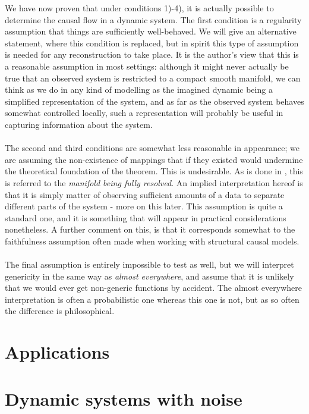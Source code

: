 \documentclass[11pt, a4paper]{memoir}
\theoremstyle{plain}
\theoremstyle{definition}
\begin{document}
We have now proven that under conditions 1)-4), it is actually possible to determine the causal flow in a dynamic system. The first condition is a regularity assumption that things are sufficiently well-behaved. We will give an alternative statement, where this condition is replaced, but in spirit this type of assumption is needed for any reconstruction to take place. It is the author's view that this is a reasonable assumption in most settings: although it might never actually be true that an observed system is restricted to a compact smooth manifold, we can think as we do in any kind of modelling as the imagined dynamic being a simplified representation of the system, and as far as the observed system behaves somewhat controlled locally, such a representation will probably be useful in capturing information about the system.\\\\ The second and third conditions are somewhat less reasonable in appearance; we are assuming the non-existence of mappings that if they existed would undermine the theoretical foundation of the theorem. This is undesirable. As is done in \cite{mathFound}, this is referred to the \textit{manifold being fully resolved}. An implied interpretation hereof is that it is simply matter of observing sufficient amounts of a data to separate different parts of the system - more on this later. This assumption is quite a standard one, and it is something that will appear in practical considerations nonetheless. A further comment on this, is that it corresponds somewhat to the faithfulness assumption often made when working with structural causal models.\\\\ The final assumption is entirely impossible to test as well, but we will interpret genericity in the same way as \textit{almost everywhere}, and assume that it is unlikely that we would ever get non-generic functions by accident. The almost everywhere interpretation is often a probabilistic one whereas this one is not, but as so often the difference is philosophical.



\section{Applications}

\section{Dynamic systems with noise}
 
\end{document}
